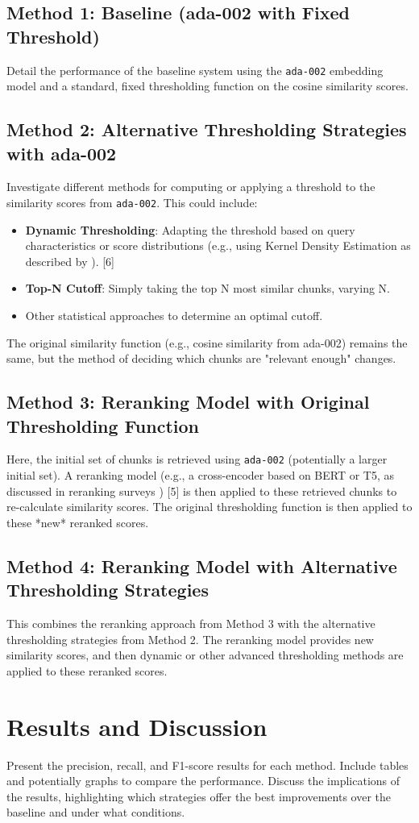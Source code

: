 \subsection{Method 1: Baseline (ada-002 with Fixed Threshold)}
Detail the performance of the baseline system using the \texttt{ada-002} embedding model and a standard, fixed thresholding function on the cosine similarity scores.

\subsection{Method 2: Alternative Thresholding Strategies with ada-002}
Investigate different methods for computing or applying a threshold to the similarity scores from \texttt{ada-002}. This could include:
\begin{itemize}
    \item \textbf{Dynamic Thresholding}: Adapting the threshold based on query characteristics or score distributions (e.g., using Kernel Density Estimation as described by \autocite{dynamic_thresholding_dell_2023}). [6]
    \item \textbf{Top-N Cutoff}: Simply taking the top N most similar chunks, varying N.
    \item Other statistical approaches to determine an optimal cutoff.
\end{itemize}
The original similarity function (e.g., cosine similarity from ada-002) remains the same, but the method of deciding which chunks are "relevant enough" changes.

\subsection{Method 3: Reranking Model with Original Thresholding Function}
Here, the initial set of chunks is retrieved using \texttt{ada-002} (potentially a larger initial set). A reranking model (e.g., a cross-encoder based on BERT or T5, as discussed in reranking surveys \autocite{reranking_survey_2025_djoudi}) [5] is then applied to these retrieved chunks to re-calculate similarity scores. The original thresholding function is then applied to these *new* reranked scores.

\subsection{Method 4: Reranking Model with Alternative Thresholding Strategies}
This combines the reranking approach from Method 3 with the alternative thresholding strategies from Method 2. The reranking model provides new similarity scores, and then dynamic or other advanced thresholding methods are applied to these reranked scores.

\section{Results and Discussion}
Present the precision, recall, and F1-score results for each method. Include tables and potentially graphs to compare the performance. Discuss the implications of the results, highlighting which strategies offer the best improvements over the baseline and under what conditions.